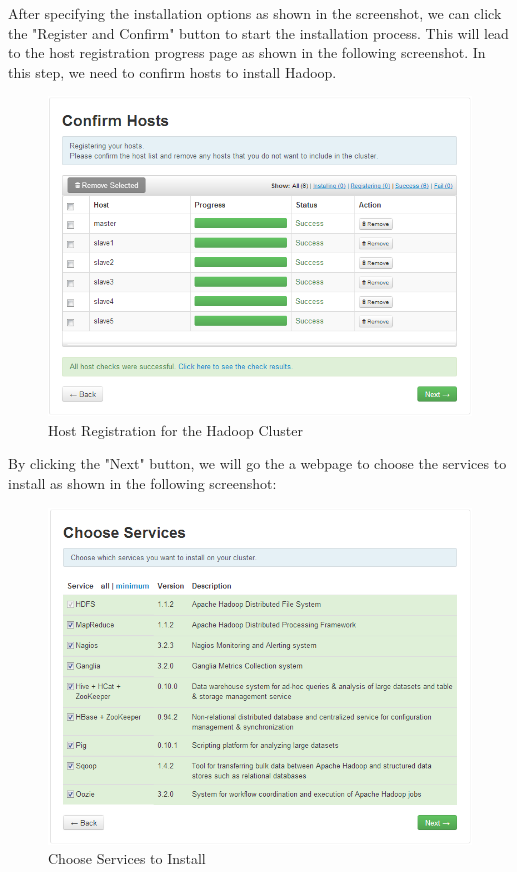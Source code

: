 After specifying the installation options as shown in the screenshot, we can click the "Register and Confirm" button to start the installation process.  This will lead to the host registration progress page as shown in the following screenshot. In this step, we need to confirm hosts to install Hadoop.
\begin{figure}[h]
  \centering
  \includegraphics[width=.8\textwidth]{figs/5163os_06_17.png}
  \caption{Host Registration for the Hadoop Cluster}\label{fig:host.registration}
\end{figure} 

By clicking the "Next" button, we will go the a webpage to choose the services to install as shown in the following screenshot:
\begin{figure}[h]
  \centering
  \includegraphics[width=.8\textwidth]{figs/5163os_06_18.png}
  \caption{Choose Services to Install}\label{fig:choose.services}
\end{figure} 

